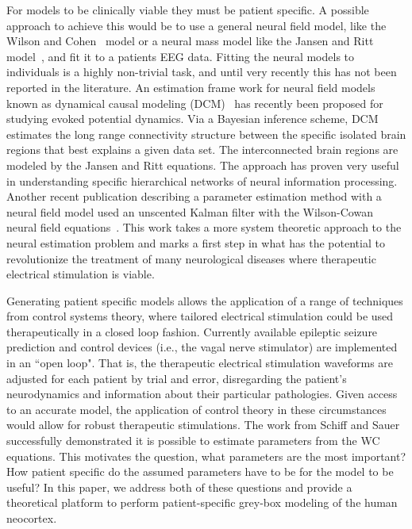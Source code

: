 \documentclass[onecolumn,draftcls]{IEEEtran}
\begin{document}
For models to be clinically viable they must be patient specific. A possible approach to achieve this would be to use a general neural field model, like the Wilson and Cohen~\cite{Wilson1973} model or a neural mass model like the Jansen and Ritt model~\cite{Jansen1995}, and fit it to a patients EEG data. Fitting the neural models to individuals is a highly non-trivial task, and until very recently this has not been reported in the literature. An estimation frame work for neural field models known as dynamical causal modeling (DCM)~\cite{David2003} \cite{David2006} has recently been proposed for studying evoked potential dynamics. Via a Bayesian inference scheme, DCM estimates the long range connectivity structure between the specific isolated brain regions that best explains a given data set. The interconnected brain regions are modeled by the Jansen and Ritt equations. The approach has proven very useful in understanding specific hierarchical networks of neural information processing. Another recent publication describing a parameter estimation method with a neural field model used an unscented Kalman filter with the Wilson-Cowan neural field equations~\cite{schiff2008kalman}.  This work takes a more system theoretic approach to the neural estimation problem and marks a first step in what has the potential to revolutionize the treatment of many neurological diseases where therapeutic electrical stimulation is viable.

Generating patient specific models allows the application of a range of techniques from control systems theory, where tailored electrical stimulation could be used therapeutically in a closed loop fashion.  Currently available epileptic seizure prediction and control devices (i.e., the vagal nerve stimulator) are implemented in an ``open loop".  That is, the therapeutic electrical stimulation waveforms are adjusted for each patient by trial and error, disregarding the patient's neurodynamics and information about their particular pathologies. Given access to an accurate model, the application of control theory in these circumstances would allow for robust therapeutic stimulations.
The work from Schiff and Sauer~\cite{schiff2008kalman} successfully demonstrated  it is possible to estimate parameters from the WC equations. This motivates the question, what parameters are the most important? How patient specific do the assumed parameters have to be for the model to be useful? In this paper, we address both of these questions and provide a theoretical platform to perform patient-specific grey-box modeling of the human neocortex.
\end{document}
